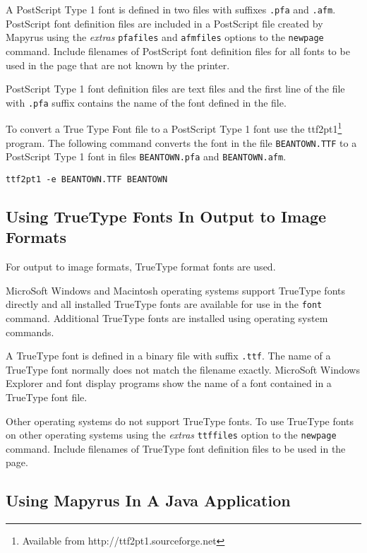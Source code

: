 A PostScript Type 1 font is defined in two files with suffixes
\texttt{.pfa} and \texttt{.afm}.  PostScript
font definition files are included in a PostScript file created
by Mapyrus using the
\textit{extras} \texttt{pfafiles} and \texttt{afmfiles}
options to the \texttt{newpage} command.
Include filenames of PostScript font definition files for all fonts to be used
in the page that are not known by the printer.

PostScript Type 1 font definition files are text files and
the first line of the file with \texttt{.pfa} suffix
contains the name of the font defined in the file.

To convert a True Type Font file to a PostScript Type 1 font use the
ttf2pt1\footnote{Available from http://ttf2pt1.sourceforge.net} program.  The
following command converts the font in the file \texttt{BEANTOWN.TTF} to a
PostScript Type 1 font in files
\texttt{BEANTOWN.pfa} and
\texttt{BEANTOWN.afm}.

\begin{verbatim}
ttf2pt1 -e BEANTOWN.TTF BEANTOWN
\end{verbatim}

\subsection{Using TrueType Fonts In Output to Image Formats}
\label{ttffonts}

For output to image formats, TrueType format fonts are used.

MicroSoft Windows and Macintosh operating systems support TrueType
fonts directly and all installed TrueType fonts are available
for use in the \texttt{font} command.
Additional TrueType fonts are installed using operating system commands.

A TrueType font is defined in a binary file with suffix
\texttt{.ttf}.
The name of a TrueType font normally does not match the filename exactly.
MicroSoft Windows Explorer and font display programs show the name of
a font contained in a TrueType font file.

Other operating systems do not support TrueType fonts.  To use TrueType fonts
on other operating systems using the \textit{extras} \texttt{ttffiles} option
to the \texttt{newpage} command.  Include filenames of TrueType font definition
files to be used in the page.

\subsection{Using Mapyrus In A Java Application}
\label{javaapi}

